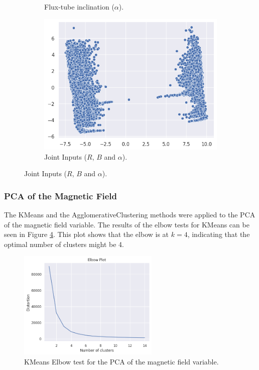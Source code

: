 \begin{figure}[]
\begin{subfigure}[h]{0.329\textwidth}
        \caption{Flux-tube inclination ($\alpha$).}
        \label{fig:pca_alpha_2d}
    \end{subfigure}
    \begin{subfigure}[h]{0.329\textwidth}
        \centering
        \includegraphics[width=\textwidth]{figures/pca_joint_2d.png}
        \caption{Joint Inputs ($R$, $B$ and $\alpha$).}
        \label{fig:pca_joint_2d}
    \end{subfigure}
\end{figure}


\subsubsection{PCA of the Magnetic Field}\label{sec:pca_b}

The KMeans and the AgglomerativeClustering methods were applied to the PCA of the magnetic field variable. The results of the elbow tests for KMeans can be seen in Figure \ref{fig:pca_b_elbow}. This plot shows that the elbow is at $k=4$, indicating that the optimal number of clusters might be 4. 

\begin{figure}[h]
    \caption{KMeans Elbow test for the PCA of the magnetic field variable.}
    \label{fig:pca_b_elbow}
    \centering
    \includegraphics[width=0.6\textwidth]{figures/pca_mag_elbow_test.png}
\end{figure}

